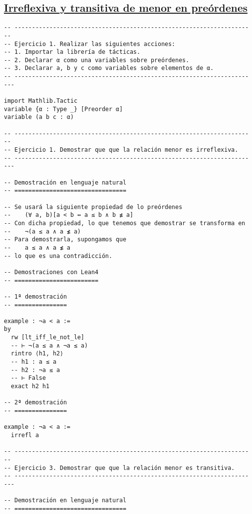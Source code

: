 \subsection{\href{./src/Logica/Irreflexiva\_y\_transitiva\_de\_menor\_en\_preordenes.lean}{Irreflexiva y transitiva de menor en preórdenes}}
\label{sec:org6cd0f96}
\begin{verbatim}
-- ---------------------------------------------------------------------
-- Ejercicio 1. Realizar las siguientes acciones:
-- 1. Importar la librería de tácticas.
-- 2. Declarar α como una variables sobre preórdenes.
-- 3. Declarar a, b y c como variables sobre elementos de α.
-- ----------------------------------------------------------------------

import Mathlib.Tactic
variable {α : Type _} [Preorder α]
variable (a b c : α)

-- ---------------------------------------------------------------------
-- Ejercicio 1. Demostrar que que la relación menor es irreflexiva.
-- ----------------------------------------------------------------------

-- Demostración en lenguaje natural
-- ================================

-- Se usará la siguiente propiedad de lo preórdenes
--    (∀ a, b)[a < b ↔ a ≤ b ∧ b ≰ a]
-- Con dicha propiedad, lo que tenemos que demostrar se transforma en
--    ¬(a ≤ a ∧ a ≰ a)
-- Para demostrarla, supongamos que
--    a ≤ a ∧ a ≰ a
-- lo que es una contradicción.

-- Demostraciones con Lean4
-- ========================

-- 1ª demostración
-- ===============

example : ¬a < a :=
by
  rw [lt_iff_le_not_le]
  -- ⊢ ¬(a ≤ a ∧ ¬a ≤ a)
  rintro ⟨h1, h2⟩
  -- h1 : a ≤ a
  -- h2 : ¬a ≤ a
  -- ⊢ False
  exact h2 h1

-- 2ª demostración
-- ===============

example : ¬a < a :=
  irrefl a

-- ---------------------------------------------------------------------
-- Ejercicio 3. Demostrar que que la relación menor es transitiva.
-- ----------------------------------------------------------------------

-- Demostración en lenguaje natural
-- ================================


\end{verbatim}
